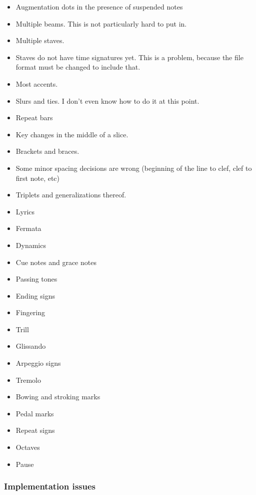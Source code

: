 \begin{itemize}
\item Augmentation dots in the presence of suspended notes 
\item Multiple beams.  This is not particularly hard to put in.  
\item Multiple staves.
\item Staves do not have time signatures yet.  This is a problem,
  because the file format must be changed to include that.
\item Most accents. 
\item Slurs and ties.  I don't even know how to do it at this point. 
\item Repeat bars
\item Key changes in the middle of a slice. 
\item Brackets and braces.
\item Some minor spacing decisions are wrong (beginning of the line to
  clef, clef to first note, etc)
\item Triplets and generalizations thereof.
\item Lyrics
\item Fermata
\item Dynamics
\item Cue notes and grace notes
\item Passing tones
\item Ending signs
\item Fingering
\item Trill
\item Glissando
\item Arpeggio signs
\item Tremolo
\item Bowing and stroking marks
\item Pedal marks
\item Repeat signs
\item Octaves
\item Pause
\end{itemize}

\subsubsection{Implementation issues}

